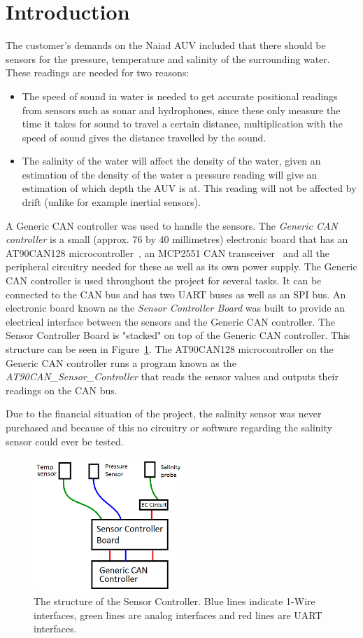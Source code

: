 
\section{Introduction}\label{sec:introduction}
The customer's demands on the Naiad AUV included that there should be sensors for the pressure, temperature and salinity of the surrounding water. These readings are needed for two reasons: 

\begin{itemize}
\item The speed of sound in water is needed to get accurate positional readings from sensors such as sonar and hydrophones, since these only measure the time it takes for sound to travel a certain distance, multiplication with the speed of sound gives the distance travelled by the sound.

\item The salinity of the water will affect the density of the water, given an estimation of the density of the water a pressure reading will give an estimation of which depth the AUV is at. This reading will not be affected by drift (unlike for example inertial sensors).

\end{itemize}

A Generic CAN controller was used to handle the sensors. The \emph{Generic CAN controller} is a small (approx. 76 by 40 millimetres) electronic board that has an AT90CAN128 microcontroller~\cite{web:at90can}, an MCP2551 CAN transceiver~\cite{web:mcp2551} and all the peripheral circuitry needed for these as well as its own power supply. The Generic CAN controller is used throughout the project for several tasks. It can be connected to the CAN bus and has two UART buses as well as an SPI bus. \newline
An electronic board known as the \emph{Sensor Controller Board} was built to provide an electrical interface between the sensors and the Generic CAN controller. The Sensor Controller Board is "stacked" on top of the Generic CAN controller. This structure can be seen in Figure~\ref{fig:sensor_overview}.  \newline
The AT90CAN128 microcontroller on the Generic CAN controller runs a program known as the \newline
\emph{AT90CAN\_Sensor\_Controller} that reads the sensor values and outputs their readings on the CAN bus.

Due to the financial situation of the project, the salinity sensor was never purchased and because of this no circuitry or software regarding  the salinity sensor could ever be tested. 

\begin{figure}[h]
    \includegraphics[width=0.5\textwidth]{./figure/sensor_overview.png}
    \caption{The structure of the Sensor Controller. Blue lines indicate 1-Wire interfaces, green lines are analog interfaces and red lines are UART interfaces.}
    \label{fig:sensor_overview}
\end{figure}